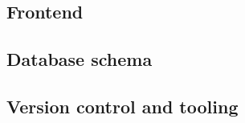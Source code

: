 \documentclass[../main.tex]{subfiles}
\begin{document}

\subsection{Frontend}


\subsection{Database schema}


\subsection{Version control and tooling}
\end{document}
